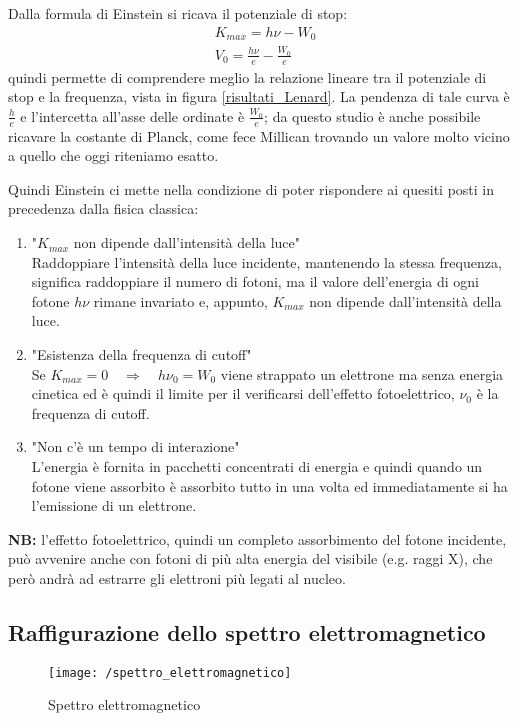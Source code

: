 Dalla formula di Einstein si ricava il potenziale di stop:
\begin{equation}
\begin{split}
& K_{max} = h\nu - W_0 \\
& V_0 = \frac{ h\nu}{e } - \frac{ W_0}{e }
\end{split}
\end{equation}
quindi permette di comprendere meglio la relazione lineare tra il potenziale  di stop e la frequenza, vista in figura \ref{risultati_Lenard}.
La pendenza di tale curva è $\frac{ h}{e }$ e l'intercetta all'asse delle ordinate è $\frac{ W_0}{e }$; da questo studio è anche possibile ricavare la costante di Planck, come fece Millican trovando un valore molto vicino a quello che oggi riteniamo esatto.

\newpage

Quindi Einstein ci mette nella condizione di poter rispondere ai quesiti posti in precedenza dalla fisica classica:
\begin{enumerate}[label=\Roman{*}]
\item "$K_{max}$ non dipende dall'intensità della luce" \\
Raddoppiare l'intensità della luce incidente, mantenendo la stessa frequenza, significa raddoppiare il numero di fotoni, ma il valore dell'energia di ogni fotone $h\nu$ rimane invariato e, appunto, $K_{max}$ non dipende dall'intensità della luce.

\item "Esistenza della frequenza di cutoff"\\
Se $K_{max} = 0 \quad \Rightarrow \quad h\nu_0 = W_0$ viene strappato un elettrone ma senza energia cinetica ed è quindi il limite per il verificarsi dell'effetto fotoelettrico, $\nu_0$ è la frequenza di cutoff.

\item "Non c'è un tempo di interazione"\\
L'energia è fornita in pacchetti concentrati di energia e quindi quando un fotone viene assorbito è assorbito tutto in una volta ed immediatamente si ha l'emissione di un elettrone.
\end{enumerate}

\textbf{NB:} l'effetto fotoelettrico, quindi un completo assorbimento del fotone incidente, può avvenire anche con fotoni di più alta energia del visibile (e.g. raggi X), che però andrà ad estrarre gli elettroni più legati al nucleo.

\subsection{Raffigurazione dello spettro elettromagnetico}
\begin{figure}[h]
\centering
\texttt{[image: /spettro\_elettromagnetico]}
\caption{Spettro elettromagnetico}
\end{figure}

